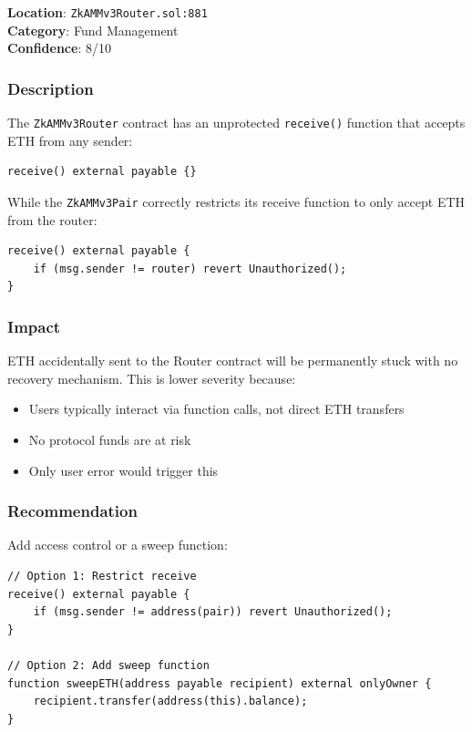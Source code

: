 \documentclass[12pt,a4paper]{article}
\begin{document}
\begin{tcolorbox}[colback=orange!10, colframe=orange!80!black, title=Medium Severity]
\textbf{Location}: \texttt{ZkAMMv3Router.sol:881}\\
\textbf{Category}: Fund Management\\
\textbf{Confidence}: 8/10
\end{tcolorbox}

\subsubsection{Description}

The \texttt{ZkAMMv3Router} contract has an unprotected \texttt{receive()} function that accepts ETH from any sender:

\begin{lstlisting}[language=Solidity]
receive() external payable {}
\end{lstlisting}

While the \texttt{ZkAMMv3Pair} correctly restricts its receive function to only accept ETH from the router:

\begin{lstlisting}[language=Solidity]
receive() external payable {
    if (msg.sender != router) revert Unauthorized();
}
\end{lstlisting}

\subsubsection{Impact}

ETH accidentally sent to the Router contract will be permanently stuck with no recovery mechanism. This is lower severity because:
\begin{itemize}
    \item Users typically interact via function calls, not direct ETH transfers
    \item No protocol funds are at risk
    \item Only user error would trigger this
\end{itemize}

\subsubsection{Recommendation}

Add access control or a sweep function:

\begin{lstlisting}[language=Solidity]
// Option 1: Restrict receive
receive() external payable {
    if (msg.sender != address(pair)) revert Unauthorized();
}

// Option 2: Add sweep function
function sweepETH(address payable recipient) external onlyOwner {
    recipient.transfer(address(this).balance);
}
\end{lstlisting}
\end{document}
